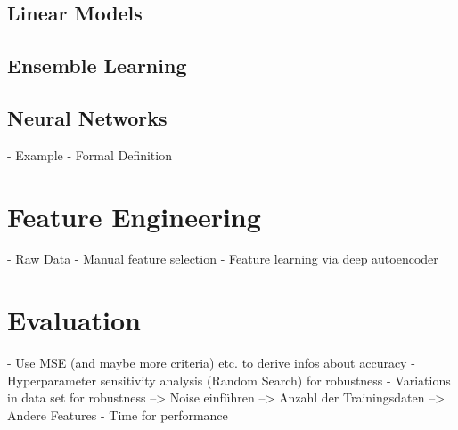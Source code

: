 \subsection{Linear Models}

\subsection{Ensemble Learning}

\subsection{Neural Networks}
- Example
- Formal Definition

\section{Feature Engineering}

- Raw Data 
- Manual feature selection
- Feature learning via deep autoencoder

\section{Evaluation} 
- Use MSE (and maybe more criteria) etc. to derive infos about accuracy
- Hyperparameter sensitivity analysis (Random Search) for robustness
- Variations in data set for robustness
--> Noise einführen 
--> Anzahl der Trainingsdaten
--> Andere Features
- Time for performance